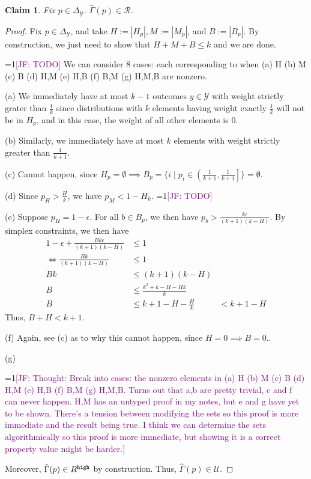 \documentclass[12pt]{article}
\newcommand{\Comments}{1}
\newcommand{\mynote}[2]{\ifnum\Comments=1\textcolor{#1}{#2}\fi}
\newcommand{\jessie}[1]{\mynote{purple}{[JF: #1]}}
\newcommand{\simplex}{\Delta_\Y}
\newcommand{\R}{\mathcal{R}}
\newcommand{\U}{\mathcal{U}}
\newcommand{\Y}{\mathcal{Y}}
\newtheorem{claim}{Claim}
\begin{document}
\begin{claim}\label{claim:hat-Gamma-subset-R}
	Fix $p \in \simplex$.
	$\hat \Gamma(p) \in \R$.
\end{claim}	
\begin{proof}
	Fix $p \in \simplex$, and take $H := |H_p|, M:= |M_p|$, and $B := |B_p|$.
	By construction, we just need to show that $H + M + B \leq k$ and we are done.
	
	\jessie{TODO}
	We can consider $8$ cases: each corresponding to when (a) H (b) M (c) B (d) H,M (e) H,B (f) B,M (g) H,M,B are nonzero.
	
	(a) We immediately have at most $k-1$ outcomes $y \in \Y$ with weight strictly grater than $\frac 1 k$ since distributions with $k$ elements having weight exactly $\frac 1 k$ will not be in $H_p$, and in this case, the weight of all other elements is $0$.
	
	(b) Similarly, we immediately have at most $k$ elements with weight strictly greater than $\frac 1 {k+1}$.
	
	(c) Cannot happen, since $H_p = \emptyset \implies B_p = \{i \mid p_i \in \left(\frac{1}{k+1}, \frac{1}{k+1}\right]\} = \emptyset$.
	
	(d) Since $p_H > \frac H k$, we have $p_M < 1 - H_k$.
	\jessie{TODO}
	
	
	(e) Suppose $p_H = 1 - \epsilon$.
	For all $b \in B_p$, we then have $p_b > \frac{k \epsilon}{(k+1)(k-H)}$.
	By simplex constraints, we then have 
	\begin{align*}
	1 - \epsilon + \frac{Bk\epsilon}{(k+1)(k-H)}&\leq 1 \\
	\iff \frac{Bk}{(k+1)(k-H)}&\leq 1 \\
	Bk &\leq (k+1)(k-H)\\
	B &\leq \frac{k^2 + k - H - Hk}{k}\\
	B &\leq k+1-H - \frac H k
	&< k+1 - H
	\end{align*}
	Thus, $B+H < k+1$.
	
	(f) Again, see (c) as to why this cannot happen, since $H = 0 \implies B = 0$..
	
	(g)
	
	
	\jessie{Thought: Break into cases: the nonzero elements in (a) H (b) M (c) B (d) H,M (e) H,B (f) B,M (g) H,M,B.  Turns out that a,b are pretty trivial, c and f can never happen.  H,M has an untyped proof in my notes, but e and g have yet to be shown.  There's a tension between modifying the sets so this proof is more immediate and the result being true.  I think we can determine the sets algorithmically so this proof is more immediate, but showing it is a correct property value might be harder.}
	
	
	Moreover, $\hat \Gamma(p) \in R^{\tt high}$ by construction.
	Thus, $\hat \Gamma(p) \in \U$.
\end{proof}
\end{document}
